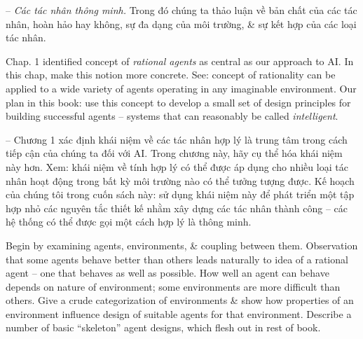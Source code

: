 \documentclass{article}
\begin{document}
\begin{itemize}
\begin{itemize}
		-- {\it Các tác nhân thông minh.} Trong đó chúng ta thảo luận về bản chất của các tác nhân, hoàn hảo hay không, sự đa dạng của môi trường, \& sự kết hợp của các loại tác nhân.
		
		Chap. 1 identified concept of {\it rational agents} as central as our approach to AI. In this chap, make this notion more concrete. See: concept of rationality can be applied to a wide variety of agents operating in any imaginable environment. Our plan in this book: use this concept to develop a small set of design principles for building successful agents -- systems that can reasonably be called {\it intelligent}.
		
		-- Chương 1 xác định khái niệm về các tác nhân hợp lý là trung tâm trong cách tiếp cận của chúng ta đối với AI. Trong chương này, hãy cụ thể hóa khái niệm này hơn. Xem: khái niệm về tính hợp lý có thể được áp dụng cho nhiều loại tác nhân hoạt động trong bất kỳ môi trường nào có thể tưởng tượng được. Kế hoạch của chúng tôi trong cuốn sách này: sử dụng khái niệm này để phát triển một tập hợp nhỏ các nguyên tắc thiết kế nhằm xây dựng các tác nhân thành công -- các hệ thống có thể được gọi một cách hợp lý là thông minh.
		
		Begin by examining agents, environments, \& coupling between them. Observation that some agents behave better than others leads naturally to idea of a rational agent -- one that behaves as well as possible. How well an agent can behave depends on nature of environment; some environments are more difficult than others. Give a crude categorization of environments \& show how properties of an environment influence design of suitable agents for that environment. Describe a number of basic ``skeleton'' agent designs, which flesh out in rest of book.
		

\end{itemize}
\end{itemize}
\end{document}
